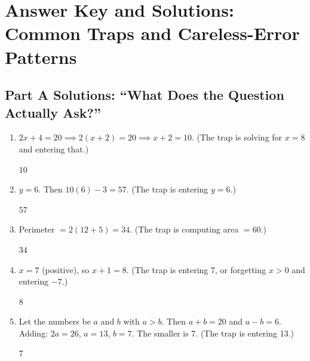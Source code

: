 \documentclass[14pt]{extarticle}
\begin{document}
\newpage

\section*{Answer Key and Solutions: Common Traps and Careless-Error Patterns}

\subsection*{Part A Solutions: ``What Does the Question Actually Ask?''}
\begin{enumerate}
  \item \(2x + 4 = 20 \implies 2(x + 2) = 20 \implies x + 2 = 10\). (The trap is solving for \(x = 8\) and entering that.)

  \(\boxed{10}\)

  \item \(y = 6\). Then \(10(6) - 3 = 57\). (The trap is entering \(y = 6\).)

  \(\boxed{57}\)

  \item Perimeter \(= 2(12 + 5) = 34\). (The trap is computing area \(= 60\).)

  \(\boxed{34}\)

  \item \(x = 7\) (positive), so \(x + 1 = 8\). (The trap is entering 7, or forgetting \(x > 0\) and entering \(-7\).)

  \(\boxed{8}\)

  \item Let the numbers be \(a\) and \(b\) with \(a > b\). Then \(a + b = 20\) and \(a - b = 6\). Adding: \(2a = 26\), \(a = 13\), \(b = 7\). The smaller is 7. (The trap is entering 13.)

  \(\boxed{7}\)
\end{enumerate}
\end{document}

